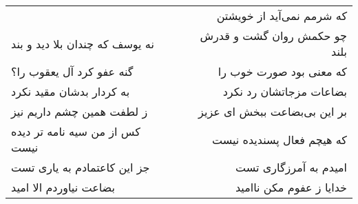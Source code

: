 \begin{center}
\begin{longtable}{l p{0.5cm} r}
&&
که شرمم نمی‌آید از خویشتن
\\
نه یوسف که چندان بلا دید و بند
&&
چو حکمش روان گشت و قدرش بلند
\\
گنه عفو کرد آل یعقوب را؟
&&
که معنی بود صورت خوب را
\\
به کردار بدشان مقید نکرد
&&
بضاعات مزجاتشان رد نکرد
\\
ز لطفت همین چشم داریم نیز
&&
بر این بی‌بضاعت ببخش ای عزیز
\\
کس از من سیه نامه تر دیده نیست
&&
که هیچم فعال پسندیده نیست
\\
جز این کاعتمادم به یاری تست
&&
امیدم به آمرزگاری تست
\\
بضاعت نیاوردم الا امید
&&
خدایا ز عفوم مکن ناامید
\\
\end{longtable}
\end{center}
